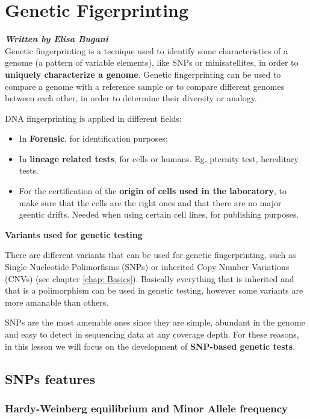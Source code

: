 \graphicspath{{chapters/GeneticFingImages/}}
\chapter{Genetic Figerprinting}

\textbf{\textit{Written by Elisa Bugani}}\\

Genetic fingerprinting is a tecnique used to identify some characteristics of a
genome (a pattern of variable elements), like SNPs or minisatellites, in order
to \textbf{uniquely characterize a genome}. Genetic fingerprinting can be used
to compare a genome with a reference sample or to compare different genomes
between each other, in order to determine their diversity or analogy. 

DNA fingerprinting is applied in different fields:

\begin{itemize}
	\item In \textbf{Forensic}, for identification purposes;
	\item In \textbf{lineage related tests}, for cells or humans. Eg. pternity
	test, hereditary tests.
	\item For the certification of the \textbf{origin of cells used in the
	laboratory}, to make sure that the cells are the right ones and that there
	are no major geentic drifts. Needed when using certain cell lines, for
	publishing purposes.
\end{itemize}


\textbf{Variants used for genetic testing}

There are different variants that can be used for genetic fingerprinting, such
as Single Nucleotide Polimorfisms (SNPs) or inherited Copy Number Variations
(CNVs) (see chapter \ref{chap: Basics}). Basically everything that is inherited
and that is a polimorphism can be used in genetic testing, however some variants
are more amanable than others. 

SNPs are the most amenable ones since they are simple, abundant in the genome
and easy to detect in sequencing data at any coverage depth. For these reasons,
in this lesson we will focus on the development of \textbf{SNP-based genetic
tests}.

\section{SNPs features}

\subsection{Hardy-Weinberg equilibrium and Minor Allele frequency}

